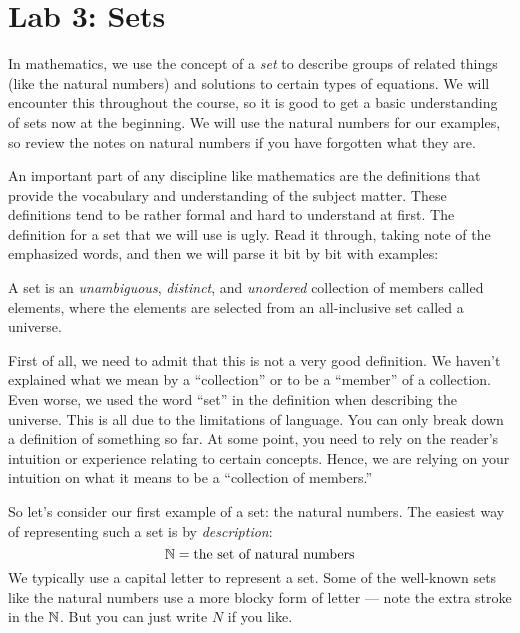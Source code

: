 \documentclass[letterpaper,12pt,fleqn]{article}
\begin{document}
\section*{Lab 3: Sets}

In mathematics, we use the concept of a \emph{set} to describe groups of
related things (like the natural numbers) and solutions to certain types of
equations. We will encounter this throughout the course, so it is good to get
a basic understanding of sets now at the beginning. We will use the natural
numbers for our examples, so review the notes on natural numbers if you have
forgotten what they are.

An important part of any discipline like mathematics are the definitions that
provide the vocabulary and understanding of the subject matter. These
definitions tend to be rather formal and hard to understand at first. The
definition for a set that we will use is ugly. Read it through, taking note of
the emphasized words, and then we will parse it bit by bit with examples:

\begin{definition}[Set]
  A set is an \emph{unambiguous}, \emph{distinct}, and \emph{unordered}
  collection of members called elements, where the elements are selected from
  an all-inclusive set called a universe.
\end{definition}

First of all, we need to admit that this is not a very good definition. We
haven't explained what we mean by a ``collection'' or to be a ``member'' of a
collection. Even worse, we used the word ``set'' in the definition when
describing the universe. This is all due to the limitations of language. You can
only break down a definition of something so far. At some point, you need to
rely on the reader's intuition or experience relating to certain concepts.
Hence, we are relying on your intuition on what it means to be a ``collection
of members.''

So let's consider our first example of a set: the natural numbers. The easiest
way of representing such a set is by \emph{description}:
\[\mathbb{N}=\mbox{the set of natural numbers}\]
We typically use a capital letter to represent a set. Some of the well-known
sets like the natural numbers use a more blocky form of letter --- note the
extra stroke in the $\mathbb{N}$. But you can just write $N$ if you like.
\end{document}
